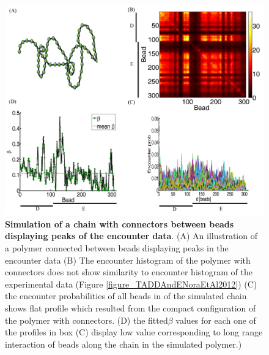 \documentclass[12pt]{article}
\begin{document}
\begin{figure}[H]
\includegraphics[scale=0.7]{Figure02_LoopsCorrespondingToPeaks307Beads}
\caption{\textbf{Simulation of a chain with connectors between beads displaying peaks of the encounter data}. (A) An illustration of a polymer connected between beads displaying peaks in the encounter data (B) The encounter histogram of the polymer with connectors does not show similarity to encounter histogram of the experimental data (Figure \ref{figure_TADDAndENoraEtAl2012}) (C) the encounter probabilities of all beads in of the simulated chain shows flat profile which resulted from the compact configuration of the polymer with connectors. (D) the fitted$\beta$ values for each one of the profiles in box (C) display low value corresponding to long range interaction of beads along the chain in the simulated polymer.)}
\label{figure_encounterProbabilityPeaksOfTheEncounterData}
\end{figure}
\end{document}
